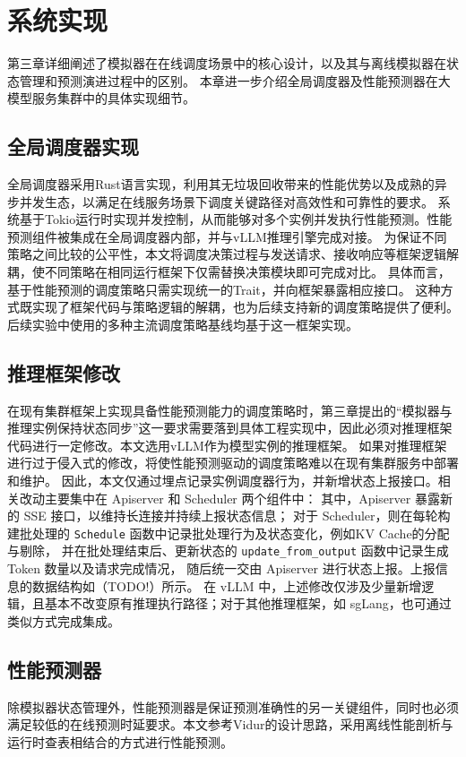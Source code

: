 
\chapter{系统实现}
\label{ch:implementation}

第三章详细阐述了模拟器在在线调度场景中的核心设计，以及其与离线模拟器在状态管理和预测演进过程中的区别。
本章进一步介绍全局调度器及性能预测器在大模型服务集群中的具体实现细节。

\section{全局调度器实现}
全局调度器采用Rust语言实现，利用其无垃圾回收带来的性能优势以及成熟的异步并发生态，以满足在线服务场景下调度关键路径对高效性和可靠性的要求。
系统基于Tokio运行时实现并发控制，从而能够对多个实例并发执行性能预测。性能预测组件被集成在全局调度器内部，并与vLLM推理引擎完成对接。
为保证不同策略之间比较的公平性，本文将调度决策过程与发送请求、接收响应等框架逻辑解耦，使不同策略在相同运行框架下仅需替换决策模块即可完成对比。
具体而言，基于性能预测的调度策略只需实现统一的Trait，并向框架暴露相应接口。
这种方式既实现了框架代码与策略逻辑的解耦，也为后续支持新的调度策略提供了便利。后续实验中使用的多种主流调度策略基线均基于这一框架实现。

\section{推理框架修改}
在现有集群框架上实现具备性能预测能力的调度策略时，第三章提出的“模拟器与推理实例保持状态同步”这一要求需要落到具体工程实现中，因此必须对推理框架代码进行一定修改。本文选用vLLM作为模型实例的推理框架。
如果对推理框架进行过于侵入式的修改，将使性能预测驱动的调度策略难以在现有集群服务中部署和维护。
因此，本文仅通过埋点记录实例调度器行为，并新增状态上报接口。相关改动主要集中在 Apiserver 和 Scheduler 两个组件中：
其中，Apiserver 暴露新的 SSE 接口，以维持长连接并持续上报状态信息；
对于 Scheduler，则在每轮构建批处理的 \texttt{Schedule} 函数中记录批处理行为及状态变化，例如KV Cache的分配与剔除，
并在批处理结束后、更新状态的 \texttt{update\_from\_output} 函数中记录生成 Token 数量以及请求完成情况，
随后统一交由 Apiserver 进行状态上报。上报信息的数据结构如（TODO!）所示。
在 vLLM 中，上述修改仅涉及少量新增逻辑，且基本不改变原有推理执行路径；对于其他推理框架，如 sgLang，也可通过类似方式完成集成。

\section{性能预测器}
除模拟器状态管理外，性能预测器是保证预测准确性的另一关键组件，同时也必须满足较低的在线预测时延要求。本文参考Vidur的设计思路，采用离线性能剖析与运行时查表相结合的方式进行性能预测。

